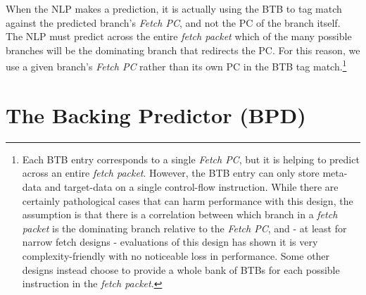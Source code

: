 When the NLP makes a prediction, it is actually using the BTB to tag match against the predicted branch's {\em Fetch PC}, and not the PC of the branch itself.  
The NLP must predict across the entire {\em fetch packet} which of the many possible branches will be the dominating branch that redirects the PC.
For this reason, we use a given branch's {\em Fetch PC} rather than its own PC in the BTB tag match.\footnote{Each BTB entry corresponds to a single {\em Fetch PC}, but it is helping to predict across an entire {\em fetch packet}. However, the BTB entry can only store meta-data and target-data on a single control-flow instruction.  While there are certainly pathological cases that can harm performance with this design, the assumption is that there is a correlation between which branch in a {\em fetch packet} is the dominating branch relative to the {\em Fetch PC}, and - at least for narrow fetch designs - evaluations of this design has shown it is very complexity-friendly with no noticeable loss in performance. Some other designs instead choose to provide a whole bank of BTBs for each possible instruction in the {\em fetch packet}.} 


\section{The Backing Predictor (BPD)}


